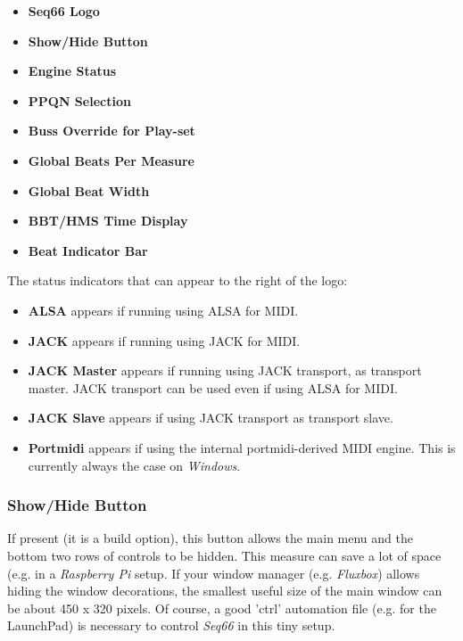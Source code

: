    \begin{itemize}
      \item \textbf{Seq66 Logo}
      \item \textbf{Show/Hide Button}
      \item \textbf{Engine Status}
      \item \textbf{PPQN Selection}
      \item \textbf{Buss Override for Play-set}
      \item \textbf{Global Beats Per Measure}
      \item \textbf{Global Beat Width}
      \item \textbf{BBT/HMS Time Display}
      \item \textbf{Beat Indicator Bar}
   \end{itemize}

   The status indicators that can appear to the right of the logo:

   \begin{itemize}
      \item \textbf{ALSA} appears if running using ALSA for MIDI.
      \item \textbf{JACK} appears if running using JACK for MIDI.
      \item \textbf{JACK Master} appears if running using JACK transport, as
         transport master.
         JACK transport can be used even if using ALSA for MIDI.
      \item \textbf{JACK Slave} appears if using JACK transport as
         transport slave.
      \item \textbf{Portmidi} appears if using the internal portmidi-derived
         MIDI engine.  This is currently always the case on \textsl{Windows}.
   \end{itemize}

\subsubsection{Show/Hide Button}
\label{subsubsec:introduction_show_hide_button}

   If present (it is a build option),
   this button allows the main menu and the bottom two
   rows of controls to be hidden.
   This measure can save a lot of space (e.g. in a \textsl{Raspberry Pi}
   setup.
   If your window manager (e.g. \textsl{Fluxbox})
   allows hiding the window decorations, the smallest useful size of the
   main window can be about 450 x 320 pixels.
   Of course, a good 'ctrl' automation file (e.g. for the LaunchPad)
   is necessary to control \textsl{Seq66} in this tiny setup.

